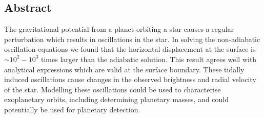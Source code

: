 \documentclass[a0,portrait]{a0poster}
\begin{document}
\vspace{0.0cm} %


\begin{multicols}{2} %


\color{black} %


\begin{tcolorbox}[colframe=black,colback=blue!10!white]

\vspace{0.5cm}

\section*{Abstract}
\large
The gravitational potential from a planet orbiting a star causes a regular perturbation which results in oscillations in the star. In solving the non-adiabatic oscillation equations we found that the horizontal displacement at the surface is $\sim 10^{2} - 10^{3}$ times larger than the adiabatic solution. This result agrees well with analytical expressions which are valid at the surface boundary. These tidally induced oscillations cause changes in the observed brightness and radial velocity of the star. Modelling these oscillations could be used to characterise exoplanetary orbits, including determining planetary masses, and could potentially be used for planetary detection.
\normalsize

\vspace{0.5cm}

\end{tcolorbox}


\color{Black} %

\begin{tcolorbox}[colframe=black,colback=blue!10!white]


\end{tcolorbox}
\end{multicols}
\end{document}
